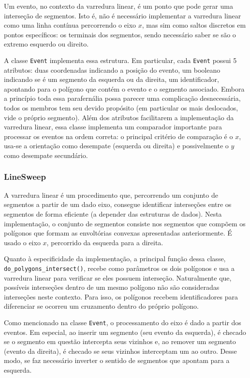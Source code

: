 \documentclass{article}
\begin{document}
Um evento, no contexto da varredura linear, é um ponto que pode gerar uma interseção de segmentos. Isto é, não é necessário implementar a varredura linear como uma linha contínua percorrendo o eixo \( x \), mas sim como saltos discretos em pontos específicos: os terminais dos segmentos, sendo necessário saber se são o extremo esquerdo ou direito.

A classe \texttt{Event} implementa essa estrutura. Em particular, cada \texttt{Event} possui 5 atributos: duas coordenadas indicando a posição do evento, um booleano indicando se é um segmento da esquerda ou da direita, um identificador, apontando para o polígono que contém o evento e o segmento associado. Embora a princípio toda essa parafernália possa parecer uma complicação desnecessária, todos os membros tem seu devido propósito (em particular os mais deslocados, vide o próprio segmento). Além dos atributos facilitarem a implementação da varredura linear, essa classe implementa um comparador importante para processar os eventos na ordem correta: o principal critério de comparação é o \( x \), usa-se a orientação como desempate (esquerda ou direita) e possivelmente o \( y \) como desempate secundário.

\subsubsection{LineSweep}

A varredura linear é um procedimento que, percorrendo um conjunto de segmentos a partir de um dado eixo, consegue identificar interseções entre os segmentos de forma eficiente (a depender das estruturas de dados). Nesta implementação, o conjunto de segmentos consiste nos segmentos que compõem os polígonos que formam as envoltórias convexas apresentadas anteriormente. É usado o eixo \( x \), percorrido da esquerda para a direita.

Quanto à especificidade da implementação, a principal função dessa classe, \texttt{do\_polygons\_intersect()}, recebe como parâmetros os dois polígonos e usa a varredura linear para verificar se eles possuem interseção. Naturalmente que, possíveis interseções dentro de um mesmo polígono não são consideradas interseções neste contexto. Para isso, os polígonos recebem identificadores para diferenciar se ocorreu um cruzamento dentro do próprio polígono.

Como mencionado na classe \texttt{Event}, o processamento do eixo é dado a partir dos eventos. Em especial, ao inserir um segmento (seu evento da esquerda), é checado se o segmento em questão intercepta seus vizinhos e, ao remover um segmento (evento da direita), é checado se seus vizinhos interceptam um ao outro. Desse modo, se faz necessário inverter o sentido de segmentos que apontam para a esquerda.
\end{document}

